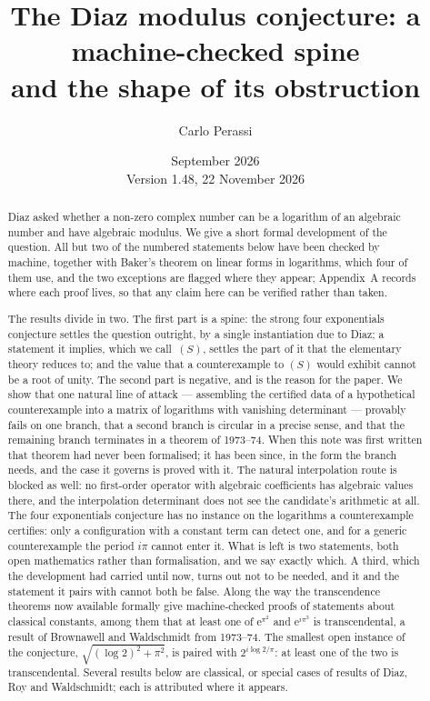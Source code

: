 \documentclass[11pt,a4paper]{article}
\title{The Diaz modulus conjecture: a machine-checked spine\\
\large and the shape of its obstruction}
\author{Carlo Perassi}
\date{September 2026\\[2pt]\small Version 1.48, 22 November 2026}
\theoremstyle{plain}
\theoremstyle{definition}
\newcommand{\e}{\mathrm{e}}
\begin{document}
\maketitle

\begin{abstract}
Diaz asked whether a non-zero complex number can be a logarithm of an algebraic
number and have algebraic modulus. We give a short formal development of the question. All but
two of the numbered statements below have been checked by machine, together with Baker's theorem
on linear forms in logarithms, which four of them use, and the two exceptions are flagged
where they appear; Appendix~A records where each proof lives, so that any claim here can be
verified rather than taken.

The results divide in two. The first part is a spine: the strong four exponentials conjecture
settles the question outright, by a single instantiation due to Diaz; a statement it implies, which we
call~$(S)$, settles the part of it that the elementary theory reduces to; and the value that a
counterexample to $(S)$ would exhibit cannot be a root of unity. The second part is negative, and is the
reason for the paper. We show that one natural line of attack --- assembling the certified data
of a hypothetical counterexample into a matrix of logarithms with vanishing determinant ---
provably fails on one branch, that a second branch is circular in a precise sense, and that the
remaining branch terminates in a theorem of 1973--74. When this note was first written that
theorem had never been formalised; it has been since, in the form the branch needs, and the case
it governs is proved with it. The natural interpolation route is blocked as well: no first-order
operator with algebraic coefficients has algebraic values there, and the interpolation determinant
does not see the candidate's arithmetic at all. The four exponentials conjecture has no instance
on the logarithms a counterexample certifies: only a configuration with a constant term can detect
one, and for a generic counterexample the period $i\pi$ cannot enter it. What is left is two
statements, both open mathematics rather than formalisation, and we say exactly which. A third, which the development had
carried until now, turns out not to be needed, and it and the statement it pairs with cannot both
be false. Along the way the transcendence theorems now available formally give machine-checked
proofs of statements about classical constants, among them that at least one of
$\e^{\pi^{2}}$ and $\e^{i\pi^{3}}$ is transcendental, a result of Brownawell and Waldschmidt from
1973--74. The smallest open instance of the conjecture, $\sqrt{(\log2)^{2}+\pi^{2}}$, is paired with
$2^{i\log2/\pi}$: at least one of the two is transcendental. Several results below are classical,
or special cases of results of Diaz, Roy and Waldschmidt; each is attributed where it appears.
\end{abstract}
\end{document}
